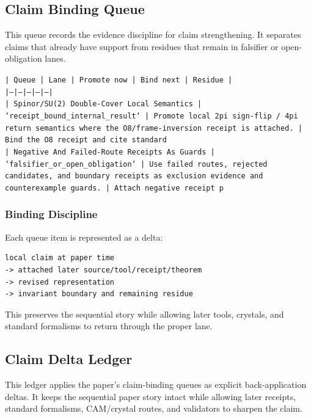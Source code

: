 \documentclass[11pt]{article}
\begin{document}
\subsection*{Claim Binding Queue}

This queue records the evidence discipline for claim strengthening. It separates claims that already have support from residues that remain in falsifier or open-obligation lanes.

\noindent\texttt{| Queue | Lane | Promote now | Bind next | Residue |}\\
\noindent\texttt{|---|---|---|---|---|}\\
\noindent\texttt{| Spinor/SU(2) Double-Cover Local Semantics | `receipt\_bound\_internal\_result` | Promote local 2pi sign-flip / 4pi return semantics where the O8/frame-inversion receipt is attached. | Bind the O8 receipt and cite standard}\\
\noindent\texttt{| Negative And Failed-Route Receipts As Guards | `falsifier\_or\_open\_obligation` | Use failed routes, rejected candidates, and boundary receipts as exclusion evidence and counterexample guards. | Attach negative receipt p}\\

\subsubsection*{Binding Discipline}

Each queue item is represented as a delta:

\begin{verbatim}
local claim at paper time
-> attached later source/tool/receipt/theorem
-> revised representation
-> invariant boundary and remaining residue
\end{verbatim}

This preserves the sequential story while allowing later tools, crystals, and
standard formalisms to return through the proper lane.

\subsection*{Claim Delta Ledger}

This ledger applies the paper's claim-binding queues as explicit back-application
deltas. It keeps the sequential paper story intact while allowing later
receipts, standard formalisms, CAM/crystal routes, and validators to sharpen the
claim.
\end{document}
